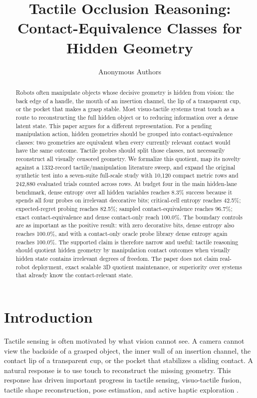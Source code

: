\documentclass{article}
\title{Tactile Occlusion Reasoning: Contact-Equivalence Classes for Hidden Geometry}
\author{Anonymous Authors}
\begin{document}
\maketitle

\begin{abstract}
Robots often manipulate objects whose decisive geometry is hidden from vision: the back edge of a handle, the mouth of an insertion channel, the lip of a transparent cup, or the pocket that makes a grasp stable. Most visuo-tactile systems treat touch as a route to reconstructing the full hidden object or to reducing information over a dense latent state. This paper argues for a different representation. For a pending manipulation action, hidden geometries should be grouped into contact-equivalence classes: two geometries are equivalent when every currently relevant contact would have the same outcome. Tactile probes should split those classes, not necessarily reconstruct all visually censored geometry. We formalize this quotient, map its novelty against a 1332-record tactile/manipulation literature sweep, and expand the original synthetic test into a seven-suite full-scale study with 10,120 compact metric rows and 242,880 evaluated trials counted across rows. At budget four in the main hidden-lane benchmark, dense entropy over all hidden variables reaches 8.3\% success because it spends all four probes on irrelevant decorative bits; critical-cell entropy reaches 42.5\%; expected-regret probing reaches 82.5\%; sampled contact-equivalence reaches 96.7\%; exact contact-equivalence and dense contact-only reach 100.0\%. The boundary controls are as important as the positive result: with zero decorative bits, dense entropy also reaches 100.0\%, and with a contact-only oracle probe library dense entropy again reaches 100.0\%. The supported claim is therefore narrow and useful: tactile reasoning should quotient hidden geometry by manipulation contact outcomes when visually hidden state contains irrelevant degrees of freedom. The paper does not claim real-robot deployment, exact scalable 3D quotient maintenance, or superiority over systems that already know the contact-relevant state.
\end{abstract}

\section{Introduction}

Tactile sensing is often motivated by what vision cannot see. A camera cannot view the backside of a grasped object, the inner wall of an insertion channel, the contact lip of a transparent cup, or the pocket that stabilizes a sliding contact. A natural response is to use touch to reconstruct the missing geometry. This response has driven important progress in tactile sensing, visuo-tactile fusion, tactile shape reconstruction, pose estimation, and active haptic exploration \citep{seminara2019active,tahoun2021visual,bauza2023tac2pose,comi2024touchsdf,huang2024normalflow,lee2025vitascope,gu2026touchanything}.
\end{document}
